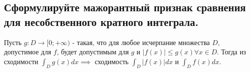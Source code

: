 
\subsection{Сформулируйте мажорантный признак сравнения для несобственного кратного интеграла.}
Пусть $g: D \rightarrow [0;+\infty)$ - такая, что для любое исчерпание множества $D$, допустимое для $f$, будет допустимым для $g$ и $|f(x)| \leq g(x) \forall x \in D$. Тогда из сходимости $\int_{D} g(x) dx \implies$ сходимость $\int_{D} |f(x)| dx$ и $\int_{D} f(x) dx$.

